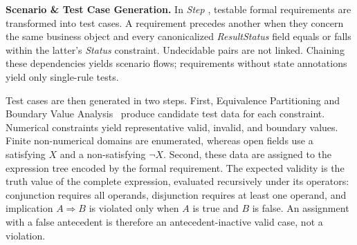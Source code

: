 \noindent
\textbf{Scenario \& Test Case Generation.}
In \textit{Step} , testable formal requirements are transformed into
test cases. A requirement precedes another when they concern the same business
object and every canonicalized \textit{ResultStatus} field equals or falls
within the latter's \textit{Status} constraint. Undecidable pairs are not
linked. Chaining these dependencies yields scenario flows; requirements
without state annotations yield only single-rule tests.

Test cases are then generated in two steps. First, Equivalence Partitioning and
Boundary Value Analysis~\cite{graham2006foundations} produce candidate test data
for each constraint. Numerical constraints yield representative valid,
invalid, and boundary values. Finite non-numerical domains are enumerated,
whereas open fields use a satisfying $X$ and a non-satisfying $\neg X$. Second,
these data are assigned to the expression tree encoded by the formal
requirement. The expected validity is the truth value of the complete
expression, evaluated recursively under its operators: conjunction requires
all operands, disjunction requires at least one operand, and implication
$A\Rightarrow B$ is violated only when $A$ is true and $B$ is false. An
assignment with a false antecedent is therefore an antecedent-inactive valid
case, not a violation.

\begin{table}[!t]
    \setlength{\tabcolsep}{8pt}
    \captionsetup{skip=2pt}
    \caption{Selected test cases for \textit{Rule 1} in Fig.~\ref{fig:rule_example}. \textit{Case 4} succeeds because another rule governs that scenario.}
    \label{tab:testcase_example}
    \centering
\end{table}


